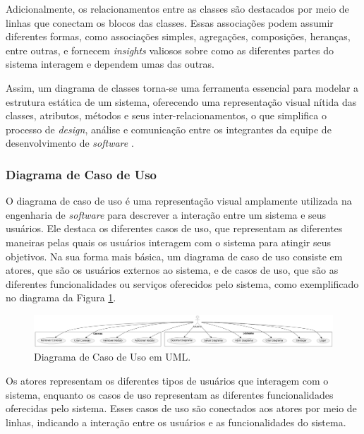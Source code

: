 Adicionalmente, os relacionamentos entre as classes são destacados por meio de linhas que conectam os blocos das classes. Essas associações podem assumir diferentes formas, como associações simples, agregações, composições, heranças, entre outras, e fornecem \textit{insights} valiosos sobre como as diferentes partes do sistema interagem e dependem umas das outras.
            
Assim, um diagrama de classes torna-se uma ferramenta essencial para modelar a estrutura estática de um sistema, oferecendo uma representação visual nítida das classes, atributos, métodos e seus inter-relacionamentos, o que simplifica o processo de \textit{design}, análise e comunicação entre os integrantes da equipe de desenvolvimento de \textit{software} \cite{softwareenguml}.
            
\subsubsection{Diagrama de Caso de Uso}
        
O diagrama de caso de uso é uma representação visual amplamente utilizada na engenharia de \textit{software} para descrever a interação entre um sistema e seus usuários. Ele destaca os diferentes casos de uso, que representam as diferentes maneiras pelas quais os usuários interagem com o sistema para atingir seus objetivos. Na sua forma mais básica, um diagrama de caso de uso consiste em atores, que são os usuários externos ao sistema, e de casos de uso, que são as diferentes funcionalidades ou serviços oferecidos pelo sistema, como exemplificado no diagrama da Figura \ref{fig:UseCaseDiagram}.
        
\begin{figure}[htb]
    \caption{\label{fig:UseCaseDiagram}Diagrama de Caso de Uso em UML.}
    \begin{center}
        \includegraphics[width=\textwidth]{figuras/UseCaseDiagram.png}
    \end{center}
\end{figure}
        
Os atores representam os diferentes tipos de usuários que interagem com o sistema, enquanto os casos de uso representam as diferentes funcionalidades oferecidas pelo sistema. Esses casos de uso são conectados aos atores por meio de linhas, indicando a interação entre os usuários e as funcionalidades do sistema.
        

